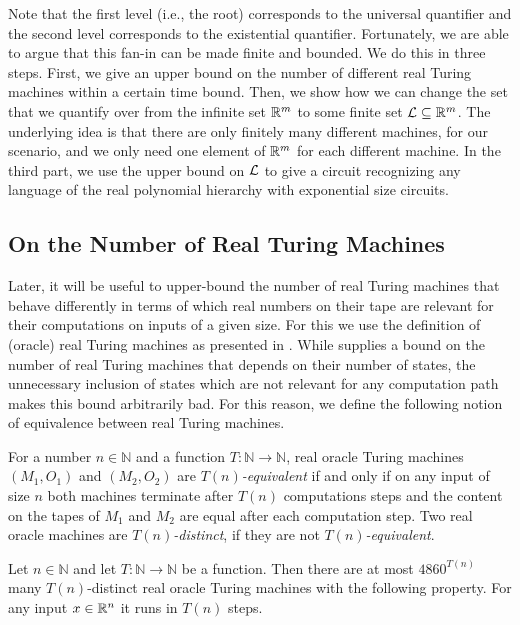 \documentclass{article}
\begin{document}
Note that the first level (i.e., the root) corresponds to the universal quantifier and the second level corresponds to the existential quantifier.
Fortunately, we are able to argue that this fan-in can be made finite and bounded. 
We do this in three steps.
First, we give an upper bound on the number of different real Turing machines within a certain time bound.
Then, we show how we can change the set that we quantify over from the infinite set $\mathbb{R}^m$ to some finite set $\mathcal{L} \subseteq \mathbb{R}^m$.
The underlying idea is that there are only finitely many different machines, for our scenario, and we only need one element of $\mathbb{R}^m$ for each different  machine.
In the third part, we use the upper bound on $\mathcal{L}$ to give a circuit recognizing any language of the real polynomial hierarchy with exponential size circuits.

\subsection{On the Number of Real Turing Machines}
\label{sub:numberTM}
Later, it will be useful to upper-bound the number of real Turing machines that behave differently in terms of which real numbers on their tape are relevant for their computations on inputs of a given size.
For this we use the definition of (oracle) real Turing machines as presented in .
While  supplies a bound on the number of real Turing machines that depends on their number of states, the unnecessary inclusion of states which are not relevant for any computation path makes this bound arbitrarily bad.
For this reason, we define the following notion of equivalence between real Turing machines.
\begin{definition}
    For a number \(n \in \mathbb{N}\) and a function $T : \mathbb{N} \rightarrow \mathbb{N}$, real oracle Turing machines \((M_1,O_1)\) and \((M_2,O_2)\) are \emph{$T(n)$-equivalent} if and only if on any input of size $n$ both machines terminate after $T(n)$ computations steps and the content on the tapes of \(M_1\) and \(M_2\) are equal after each computation step.
    Two real oracle machines are \emph{$T(n)$-distinct}, if they are not \emph{$T(n)$-equivalent}.
\end{definition}

\begin{lemma}
\label{lem:NrOfConstfreeRTMs}
    Let \(n \in \mathbb{N}\) and let $T: \mathbb{N} \rightarrow \mathbb{N}$ be a function. 
    Then there are at most \(4860^{T(n)}\) many $T(n)$-distinct real oracle Turing machines with the
    following property.
    For any input $x \in \mathbb{R}^n$ it runs in $T(n)$ steps.
\end{lemma}
\end{document}
